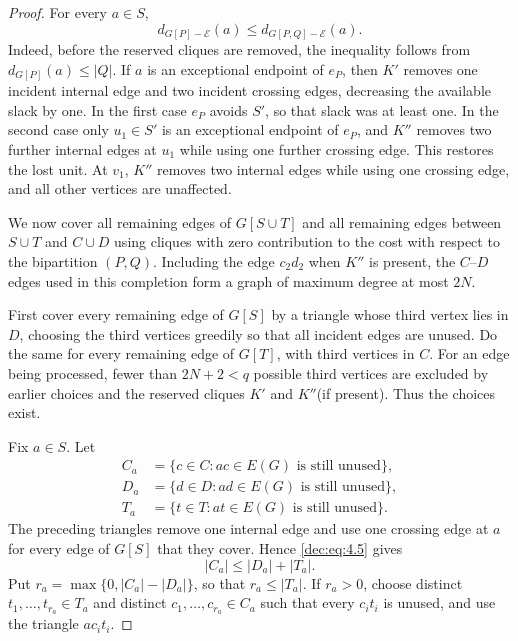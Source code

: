 \documentclass[11pt]{article}
\numberwithin{equation}{section}
\theoremstyle{remark}
\begin{document}
\begin{proof}
For every \(a\in S\),
\begin{equation}\label{dec:eq:4.5}
 d_{G[P]-\mathcal E}(a)
 \le d_{G[P,Q]-\mathcal E}(a).
\end{equation}
Indeed, before the reserved cliques are removed, the inequality follows
from \(d_{G[P]}(a)\le|Q|\).  If \(a\) is an exceptional endpoint of
\(e_P\), then \(K'\) removes one incident internal edge and two
incident crossing edges, decreasing the available slack by one.  In the
first case \(e_P\) avoids \(S'\), so that slack was at least one.
In the second case only \(u_1\in S'\) is an exceptional endpoint
of \(e_P\), and \(K''\) removes two further internal edges at \(u_1\) while
using one further crossing edge.  This restores the lost unit.  At \(v_1\),
\(K''\) removes two internal edges while using one crossing edge, and all
other vertices are unaffected.

We now cover all remaining edges of \(G[S\cup T]\) and all remaining edges between
\(S\cup T\) and \(C\cup D\) using cliques with zero
contribution to the cost with respect to the bipartition \((P,Q)\).  Including
the edge \(c_2d_2\) when \(K''\) is present, the \(C\)--\(D\) edges used in
this completion form a graph of maximum degree at most \(2N\).

First cover every remaining edge of \(G[S]\) by a triangle whose third
vertex lies in \(D\), choosing the third vertices greedily so that all
incident edges are unused.  Do the same for every remaining edge of
\(G[T]\), with third vertices in \(C\).  For an edge being processed, fewer than
\(2N+2<q\) possible third vertices are excluded by earlier choices and
the reserved cliques \(K'\) and \(K''\)(if present).  Thus the choices exist.

Fix \(a\in S\).  Let
 \begin{equation*}
 \begin{aligned}
  C_a&=\{c\in C:ac\in E(G)\text{ is still unused}\},\\
  D_a&=\{d\in D:ad\in E(G)\text{ is still unused}\},\\
  T_a&=\{t\in T:at\in E(G)\text{ is still unused}\}.
 \end{aligned}
 \end{equation*}
The preceding triangles remove one internal edge and use one crossing edge
at \(a\) for every edge of \(G[S]\) that they cover.  Hence \eqref{dec:eq:4.5} gives
\begin{equation*}
 |C_a|\le |D_a|+|T_a|.
\end{equation*}
Put \(r_a=\max\{0,|C_a|-|D_a|\}\), so that \(r_a\le|T_a|\).
If \(r_a>0\), choose distinct \(t_1,\dots,t_{r_a}\in T_a\) and distinct
\(c_1,\dots,c_{r_a}\in C_a\) such that every \(c_it_i\) is unused,
and use the triangle \(ac_it_i\).


\end{proof}
\end{document}
